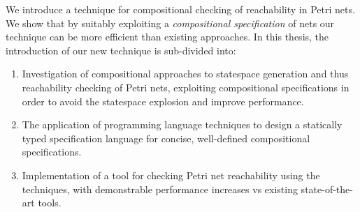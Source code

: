 We introduce a technique for compositional checking of reachability in Petri
nets. We show that by suitably exploiting a \emph{compositional specification}
of nets our technique can be more efficient than existing approaches. In this
thesis, the introduction of our new technique is sub-divided into:

\begin{enumerate}
\item Investigation of compositional approaches to statespace generation and
    thus reachability checking of Petri nets, exploiting compositional
    specifications in order to avoid the statespace explosion and improve
    performance.
\item The application of programming language techniques to design a statically
    typed specification language for concise, well-defined compositional
    specifications.
\item Implementation of a tool for checking Petri net reachability using the
    techniques, with demonstrable performance increases vs existing
    state-of-the-art tools.
\end{enumerate}
